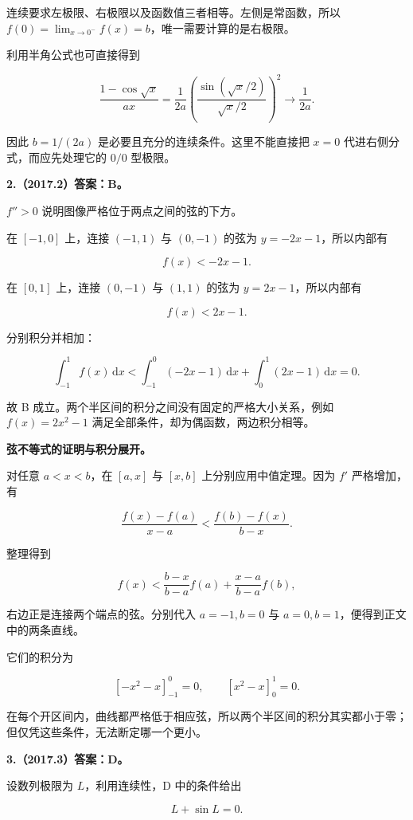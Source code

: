\documentclass[UTF8,11pt,fontset=windows]{ctexart}
\begin{document}
连续要求左极限、右极限以及函数值三者相等。左侧是常函数，所以 $f(0)=\lim_{x\to0^-}f(x)=b$，唯一需要计算的是右极限。

利用半角公式也可直接得到

$$
\frac{1-\cos\sqrt x}{ax}
=\frac{1}{2a}\left(\frac{\sin(\sqrt x/2)}{\sqrt x/2}\right)^2
\longrightarrow\frac1{2a}.
$$

因此 $b=1/(2a)$ 是必要且充分的连续条件。这里不能直接把 $x=0$ 代进右侧分式，而应先处理它的 $0/0$ 型极限。

\clearpage

\textbf{2.（2017.2）答案：B。}

$f''>0$ 说明图像严格位于两点之间的弦的下方。

在 $[-1,0]$ 上，连接 $(-1,1)$ 与 $(0,-1)$ 的弦为 $y=-2x-1$，所以内部有

$$
f(x)<-2x-1.
$$

在 $[0,1]$ 上，连接 $(0,-1)$ 与 $(1,1)$ 的弦为 $y=2x-1$，所以内部有

$$
f(x)<2x-1.
$$

分别积分并相加：

$$
\int_{-1}^1 f(x)\,\mathrm dx
<\int_{-1}^0(-2x-1)\,\mathrm dx+\int_0^1(2x-1)\,\mathrm dx=0.
$$

故 B 成立。两个半区间的积分之间没有固定的严格大小关系，例如 $f(x)=2x^2-1$ 满足全部条件，却为偶函数，两边积分相等。

\textbf{弦不等式的证明与积分展开。}

对任意 $a<x<b$，在 $[a,x]$ 与 $[x,b]$ 上分别应用中值定理。因为 $f'$ 严格增加，有

$$
\frac{f(x)-f(a)}{x-a}<\frac{f(b)-f(x)}{b-x}.
$$

整理得到

$$
f(x)<\frac{b-x}{b-a}f(a)+\frac{x-a}{b-a}f(b),
$$

右边正是连接两个端点的弦。分别代入 $a=-1,b=0$ 与 $a=0,b=1$，便得到正文中的两条直线。

它们的积分为

$$
\left[-x^2-x\right]_{-1}^{0}=0,
\qquad
\left[x^2-x\right]_{0}^{1}=0.
$$

在每个开区间内，曲线都严格低于相应弦，所以两个半区间的积分其实都小于零；但仅凭这些条件，无法断定哪一个更小。

\clearpage

\textbf{3.（2017.3）答案：D。}

设数列极限为 $L$，利用连续性，D 中的条件给出

$$
L+\sin L=0.
$$
\end{document}
